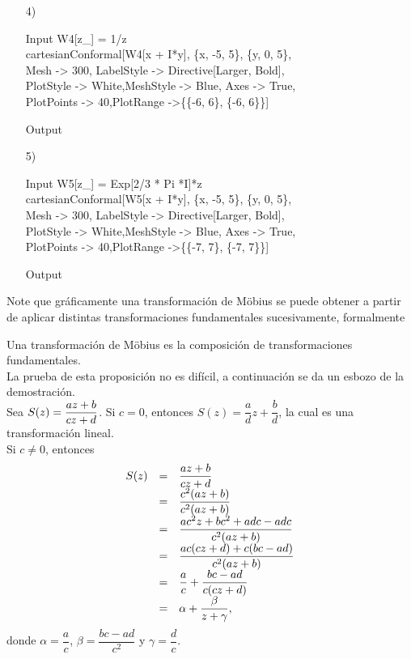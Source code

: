 \begin{Ejem}
\begin{itemize}
	\item [4)] \begin{mmaCell}{Input}
		W4[z_] = 1/z \\cartesianConformal[W4[x + I*y], \{x, -5, 5\}, \{y, 0, 5\},\\Mesh -> 300, LabelStyle -> Directive[Larger, Bold],\\PlotStyle -> White,MeshStyle -> Blue, Axes -> True,\\PlotPoints -> 40,PlotRange ->\{\{-6, 6\}, \{-6, 6\}\}]
	\end{mmaCell}
	\begin{mmaCell}[moregraphics={moreig={scale=0.7}}]{Output}
	\end{mmaCell}

	\item [5)] \begin{mmaCell}{Input}
		W5[z_] = Exp[2/3 * Pi *I]*z \\cartesianConformal[W5[x + I*y], \{x, -5, 5\}, \{y, 0, 5\},\\Mesh -> 300, LabelStyle -> Directive[Larger, Bold],\\PlotStyle -> White,MeshStyle -> Blue, Axes -> True,\\PlotPoints -> 40,PlotRange ->\{\{-7, 7\}, \{-7, 7\}\}]
	\end{mmaCell}
	\begin{mmaCell}[moregraphics={moreig={scale=0.7}}]{Output}
	\end{mmaCell}
\end{itemize}
	
\end{Ejem}
Note que gráficamente  una transformación de M\"obius se puede obtener a partir de aplicar distintas transformaciones fundamentales sucesivamente, formalmente 
\begin{prop}\label{prop4}
	Una transformación de M\"obius es la composición de transformaciones fundamentales.\\
	La prueba de esta proposición no es difícil, a continuación se da un esbozo de la demostración.\\ Sea $S(z)=\dfrac{az+b}{cz+d}$. Si $c=0$, entonces $S(z)=\dfrac{a}{d}z+\dfrac{b}{d}$, la cual es una transformación lineal.\\
	Si $c\neq 0$, entonces 
	\[
		\begin{array}{ccl}
			S(z)&=&\dfrac{az+b}{cz+d}\\
			&=&\dfrac{c^2(az+b)}{c^2(az+b)}\\
			&=&\dfrac{ac^2z + bc^2 + adc - adc}{c^2(az+b)}\\
			&=&\dfrac{ac(cz+d)+c(bc-ad)}{c^2(az+b)}\\
			&=&\dfrac{a}{c}+\dfrac{bc-ad}{c(cz+d)}\\
			&=&\alpha +\dfrac{\beta}{z+\gamma},
		\end{array}
	\]
	donde $\alpha=\dfrac{a}{c}$, $\beta=\dfrac{bc-ad}{c^2}$ y $\gamma=\dfrac{d}{c}$.\endproof
\end{prop}
